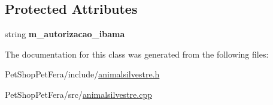 \subsection*{Protected Attributes}
\begin{DoxyCompactItemize}
\item 
\mbox{\label{class_animal_silvestre_a366b2d0e615adccc3228e9bcbc5f467e}} 
string {\bfseries m\+\_\+autorizacao\+\_\+ibama}
\end{DoxyCompactItemize}


The documentation for this class was generated from the following files\+:\begin{DoxyCompactItemize}
\item 
Pet\+Shop\+Pet\+Fera/include/\mbox{\hyperlink{animalsilvestre_8h}{animalsilvestre.\+h}}\item 
Pet\+Shop\+Pet\+Fera/src/\mbox{\hyperlink{animalsilvestre_8cpp}{animalsilvestre.\+cpp}}\end{DoxyCompactItemize}
